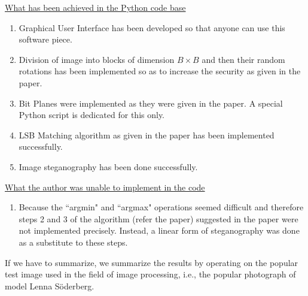 \documentclass{report}
\begin{document}
\underline{\large What has been achieved in the Python code base}
\begin{enumerate}
\item Graphical User Interface has been developed so that anyone can use this software piece.
\item Division of image into blocks of dimension $B \times B$ and then their random rotations has been implemented so as to increase the security as given in the paper.
\item Bit Planes were implemented as they were given in the paper. A special Python script is dedicated for this only.
\item LSB Matching algorithm as given in the paper has been implemented successfully.
\item Image steganography has been done successfully.
\end{enumerate}
\par
\underline{\large What the author was unable to implement in the code}
\begin{enumerate}
\item Because the ``argmin" and ``argmax" operations seemed difficult and therefore steps 2 and 3 of the algorithm (refer the paper) suggested in the paper were not implemented precisely. Instead, a linear form of steganography was done as a substitute to these steps.
\end{enumerate}
If we have to summarize, we summarize the results by operating on the popular test image used in the field of image processing, i.e., the popular photograph of model Lenna S\"{o}derberg.
\end{document}
